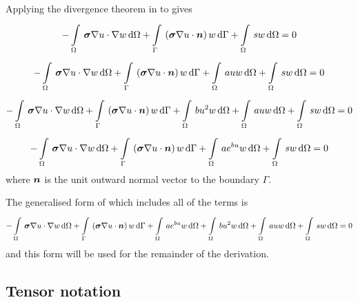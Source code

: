 Applying the divergence theorem in 
to  gives
\begin{equation}
  -\gint{\Omega}{}{\dotprod{\tensor{\sigma}
      \gradient{}{u}}{\gradient{}{w}}}{\Omega}
  +\gint{\Gamma}{}{\pbrac{\dotprod{\tensor{\sigma}\gradient{}{u}}{\normal}}w}{\Gamma}+
  \gint{\Omega}{}{sw}{\Omega}=0
  \label{eqn:GeneralPoissonWeakForm2}
\end{equation}
\begin{equation}
  -\gint{\Omega}{}{\dotprod{\tensor{\sigma}
      \gradient{}{u}}{\gradient{}{w}}}{\Omega}
  +\gint{\Gamma}{}{\pbrac{\dotprod{\tensor{\sigma}\gradient{}{u}}{\normal}}w}{\Gamma}+
  \gint{\Omega}{}{auw}{\Omega}+\gint{\Omega}{}{sw}{\Omega}=0
  \label{eqn:LinearSourcePoissonWeakForm2}
\end{equation}
\begin{equation}
  -\gint{\Omega}{}{\dotprod{\tensor{\sigma}
      \gradient{}{u}}{\gradient{}{w}}}{\Omega}
  +\gint{\Gamma}{}{\pbrac{\dotprod{\tensor{\sigma}\gradient{}{u}}{\normal}}w}{\Gamma}+
  \gint{\Omega}{}{bu^{2}w}{\Omega}+\gint{\Omega}{}{auw}{\Omega}+\gint{\Omega}{}{sw}{\Omega}=0
  \label{eqn:QuadraticSourcePoissonWeakForm2}
\end{equation}
\begin{equation}
  -\gint{\Omega}{}{\dotprod{\tensor{\sigma}
      \gradient{}{u}}{\gradient{}{w}}}{\Omega}
  +\gint{\Gamma}{}{\pbrac{\dotprod{\tensor{\sigma}\gradient{}{u}}{\normal}}w}{\Gamma}+
  \gint{\Omega}{}{ae^{bu}w}{\Omega}+\gint{\Omega}{}{sw}{\Omega}=0
  \label{eqn:ExponentialSourcePoissonWeakForm2}
\end{equation}
where $ \boldsymbol{n} $ is the unit outward normal vector to the boundary $\Gamma$.

The generalised form of
which includes all of the terms is 
\begin{equation}
  -\gint{\Omega}{}{\dotprod{\tensor{\sigma}
      \gradient{}{u}}{\gradient{}{w}}}{\Omega}
  +\gint{\Gamma}{}{\pbrac{\dotprod{\tensor{\sigma}\gradient{}{u}}{\normal}}w}{\Gamma}+
  \gint{\Omega}{}{ae^{bu}w}{\Omega}+\gint{\Omega}{}{bu^{2}w}{\Omega}+\gint{\Omega}{}{auw}{\Omega}+\gint{\Omega}{}{sw}{\Omega}=0
  \label{eqn:PoissonWeakForm2}
\end{equation}
and this form will be used for the remainder of the derivation.

\subsection{Tensor notation}

